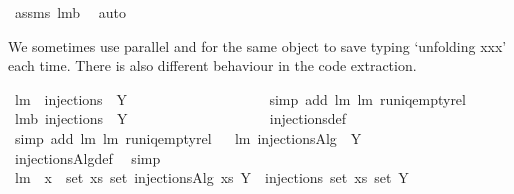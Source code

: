 \begin{isabellebody}
\ assms\ lm{}{}b\ \isamarkupfalse%
\ auto%
\endisatagproof
{\isafoldproof}%
%
\isadelimproof
%
\endisadelimproof
%
\begin{isamarkuptext}%
We sometimes use parallel  and  for the same object to save typing `unfolding xxx' each time. There is also different behaviour in the code extraction.%
\end{isamarkuptext}%
\isamarkuptrue%
\isamarkupfalse%
\ lm{}{}{\isacharcolon}\ \ {\isachardoublequoteopen}injections{\isacharprime}\ {\isacharbraceleft}{\isacharbraceright}\ Y\ \ {\isacharequal}\ \ {\isacharbraceleft}{\isacharbraceleft}{\isacharbraceright}{\isacharbraceright}{\isachardoublequoteclose}\ \isanewline
%
\isadelimproof
\ \ \ \ \ \ \ \ \ \ \ \ \ %
\endisadelimproof
%
\isatagproof
{}\isamarkupfalse%
\ {\isacharparenleft}simp\ add{\isacharcolon}\ lm{}{}\ lm{}{}\ runiq{\isacharunderscore}emptyrel{\isacharparenright}%
\endisatagproof
{\isafoldproof}%
%
\isadelimproof
\isanewline
%
\endisadelimproof
\isanewline
{}\isamarkupfalse%
\ lm{}{}b{\isacharcolon}\ {\isachardoublequoteopen}injections\ {\isacharbraceleft}{\isacharbraceright}\ Y\ \ {\isacharequal}\ \ {\isacharbraceleft}{\isacharbraceleft}{\isacharbraceright}{\isacharbraceright}{\isachardoublequoteclose}\ \isanewline
%
\isadelimproof
\ \ \ \ \ \ \ \ \ \ \ \ \ %
\endisadelimproof
%
\isatagproof
{}\isamarkupfalse%
\ injections{\isacharunderscore}def\ \isamarkupfalse%
\ {\isacharparenleft}simp\ add{\isacharcolon}\ lm{}{}\ lm{}{}\ runiq{\isacharunderscore}emptyrel{\isacharparenright}%
\endisatagproof
{\isafoldproof}%
%
\isadelimproof
\ \isanewline
%
\endisadelimproof
\isanewline
{}\isamarkupfalse%
\ lm{}{}{\isacharcolon}\ {\isachardoublequoteopen}injectionsAlg\ {\isacharbrackleft}{\isacharbrackright}\ Y\ \ {\isacharequal}\ \ {\isacharbrackleft}{\isacharbraceleft}{\isacharbraceright}{\isacharbrackright}{\isachardoublequoteclose}\ \isanewline
%
\isadelimproof
\ \ \ \ \ \ \ \ \ \ \ \ %
\endisadelimproof
%
\isatagproof
{}\isamarkupfalse%
\ injectionsAlg{\isacharunderscore}def\ \isamarkupfalse%
\ simp%
\endisatagproof
{\isafoldproof}%
%
\isadelimproof
\isanewline
%
\endisadelimproof
\isanewline
\isanewline
{}\isamarkupfalse%
\ lm{}{}{\isacharcolon}\ \ {\isachardoublequoteopen}x\ {\isasymnotin}\ set\ xs{\isachardoublequoteclose}\ {\isachardoublequoteopen}set\ {\isacharparenleft}injectionsAlg\ xs\ Y{\isacharparenright}\ {\isacharequal}\ injections\ {\isacharparenleft}set\ xs{\isacharparenright}\ {\isacharparenleft}set\ Y{\isacharparenright}{\isachardoublequoteclose}\ \isanewline

\end{isabellebody}
